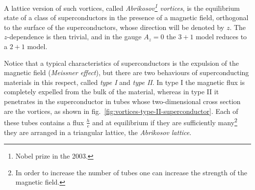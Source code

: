 \documentclass[../main/main.tex]{subfiles}
\begin{document}
A lattice version of such vortices, called \emph{Abrikosov\footnote{Nobel prize in the 2003.} vortices}, is the equilibrium state of a class of superconductors in the presence of a magnetic field, orthogonal to the surface of the superconductors, whose direction will be denoted by $z$. The $z$-dependence is then trivial, and in the gauge $A_z=0$ the $3+1$ model reduces to a $2+1$ model. 

Notice that a typical characteristics of superconductors is the expulsion of the magnetic field (\emph{Meissner effect}), but there are two behaviours of superconducting materials in this respect, called \emph{type I} and \emph{type II}. In type I the magnetic flux is completely expelled from the bulk of the material, whereas in type II it penetrates in the superconductor in tubes whose two-dimensional cross section are the vortices, as shown in fig.~\ref{fig:vortices-type-II-superconductor}. Each of these tubes contains a flux $\frac he$ and at equilibrium if they are sufficiently many\footnote{In order to increase the number of tubes one can increase the strength of the magnetic field.} they are arranged in a triangular lattice, the \emph{Abrikosov lattice}. 
\end{document}
